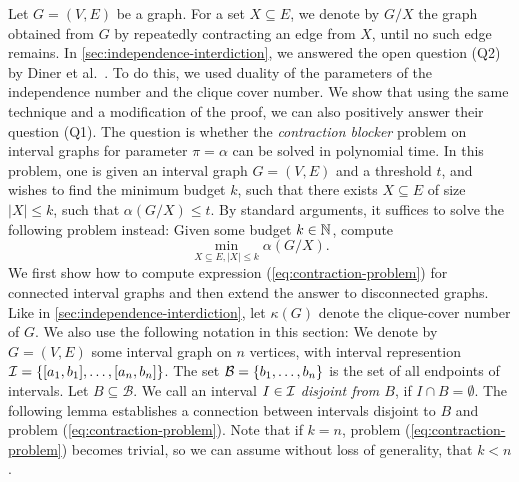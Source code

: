 Let $G = (V, E)$ be a graph. For a set $X \subseteq E$, we denote by $G/X$ the graph obtained from $G$ by repeatedly contracting an edge from $X$, until no such edge remains. In \cref{sec:independence-interdiction}, we answered the open question (Q2) by Diner et al.\ \cite{diner2018contractionDeletionBlockers}. To do this, we used duality of the parameters of the independence number and the clique cover number. We show that using the same technique and a modification of the proof, we can also positively answer their question (Q1). The question is whether the \emph{contraction blocker} problem on interval graphs for parameter $\pi = \alpha$ can be solved in polynomial time. In this problem, one is given an interval graph $G = (V, E)$ and a threshold $t$, and wishes to find the minimum budget $k$, such that there exists $X \subseteq E$ of size $|X| \leq k$, such that $\alpha(G/X) \leq t$. By standard arguments, it suffices to solve the following problem instead: Given some budget $k \in \mathbb{N}$, compute
\begin{equation}
\min_{X \subseteq E, |X| \leq k}\alpha(G/X). \label{eq:contraction-problem}
\end{equation}  
We first show how to compute expression (\ref{eq:contraction-problem}) for connected interval graphs and then extend the answer to disconnected graphs. Like in \cref{sec:independence-interdiction}, let $\kappa(G)$ denote the clique-cover number of $G$. We also use the following notation in this section: We denote by $G = (V, E)$ some interval graph on $n$ vertices, with interval represention $\mathcal{I} = \{ [a_1, b_1], \ldots, [a_n, b_n] \}$. The set $\mathcal{B} =  \{ b_1, \ldots, b_n \}$ is the set of all endpoints of intervals. Let $B \subseteq \mathcal{B}$. We call an interval $I \in \mathcal{I}$ \emph{disjoint from $B$}, if $I \cap B = \emptyset$. The following lemma establishes a connection between intervals disjoint to $B$ and problem (\ref{eq:contraction-problem}). Note that if $k = n$,  problem (\ref{eq:contraction-problem}) becomes trivial, so we can assume without loss of generality, that $k < n$.

